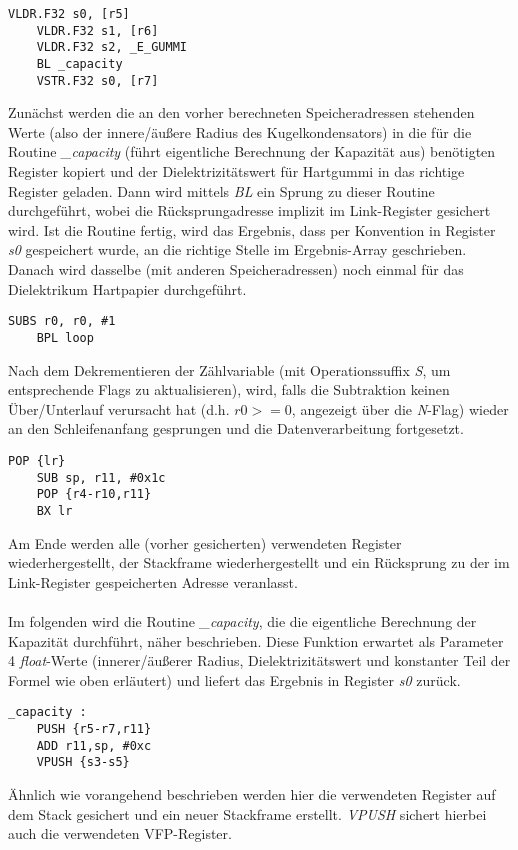 \documentclass[11pt]{scrartcl}
\begin{document}
\begin{lstlisting}[language={[x86masm]Assembler}]
	VLDR.F32 s0, [r5]
	VLDR.F32 s1, [r6]
	VLDR.F32 s2, _E_GUMMI
	BL _capacity
	VSTR.F32 s0, [r7]
\end{lstlisting}
Zunächst werden die an den vorher berechneten Speicheradressen stehenden Werte (also der innere/äußere Radius des Kugelkondensators) in die für die Routine \emph{\_capacity} (führt eigentliche Berechnung der Kapazität aus) benötigten Register kopiert und der Dielektrizitätswert für Hartgummi in das richtige Register geladen. Dann wird mittels \emph{BL} ein Sprung zu dieser Routine durchgeführt, wobei die Rücksprungadresse implizit im Link-Register gesichert wird. Ist die Routine fertig, wird das Ergebnis, dass per Konvention in Register \emph{s0} gespeichert wurde, an die richtige Stelle im Ergebnis-Array geschrieben.
Danach wird dasselbe (mit anderen Speicheradressen) noch einmal für das Dielektrikum Hartpapier durchgeführt.
\begin{lstlisting}[language={[x86masm]Assembler}]
	SUBS r0, r0, #1
	BPL loop
\end{lstlisting} 
Nach dem Dekrementieren der Zählvariable (mit Operationssuffix \emph{S}, um entsprechende Flags zu aktualisieren), wird, falls die Subtraktion keinen Über/Unterlauf verursacht hat (d.h. $r0 >= 0$, angezeigt über die \emph{N}-Flag) wieder an den Schleifenanfang gesprungen und die Datenverarbeitung fortgesetzt.
\begin{lstlisting}[language={[x86masm]Assembler}]
	POP {lr}
	SUB sp, r11, #0x1c
	POP {r4-r10,r11}
	BX lr
\end{lstlisting}
Am Ende werden alle (vorher gesicherten) verwendeten Register wiederhergestellt, der Stackframe wiederhergestellt und ein Rücksprung zu der im Link-Register gespeicherten Adresse veranlasst.
\\\\
Im folgenden wird die Routine \emph{\_capacity}, die die eigentliche Berechnung der Kapazität durchführt, näher beschrieben. Diese Funktion erwartet als Parameter 4 \emph{float}-Werte (innerer/äußerer Radius, Dielektrizitätswert und konstanter Teil der Formel wie oben erläutert) und liefert das Ergebnis in Register \emph{s0} zurück.
\begin{lstlisting}[language={[x86masm]Assembler}]
_capacity :
	PUSH {r5-r7,r11}
	ADD r11,sp, #0xc
	VPUSH {s3-s5}
\end{lstlisting}
Ähnlich wie vorangehend beschrieben werden hier die verwendeten Register auf dem Stack gesichert und ein neuer Stackframe erstellt. \emph{VPUSH} sichert hierbei auch die verwendeten VFP-Register.
\end{document}
